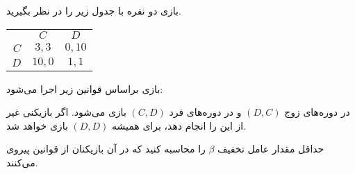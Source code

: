 بازی دو نفره با جدول زیر را در نظر بگیرید.
\LTR 
\begin{latin}
    \begin{center}
        \begin{tabular}{r | c | c |}
            \multicolumn{1}{r}{} &
            \multicolumn{1}{c}{$C$} &
            \multicolumn{1}{c}{$D$} \\ \cline{2-3}
            $C$       & $3,3$   & $0,10$  \\ \cline{2-3}
            $D$       & $10,0$   & $1,1$  \\ \cline{2-3}
        \end{tabular}
    \end{center}
\end{latin}
\RTL

بازی براساس قوانین زیر اجرا می‌شود:

در دوره‌های زوج
$(D,C)$
و در دوره‌های فرد
$(C,D)$
بازی می‌شود. اگر بازیکنی غیر از این را انجام دهد، برای همیشه
$(D,D)$
بازی خواهد شد.
\vspace*{5pt}

حداقل مقدار عامل تخفیف
$\beta$
را محاسبه کنید که در آن بازیکنان از قوانین پیروی می‌کنند.